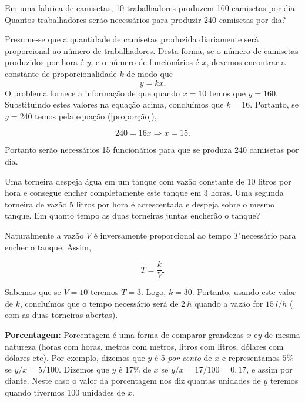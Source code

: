 \begin{exemplo} Em uma fabrica de camisetas, 10 trabalhadores produzem 160 camisetas por dia. Quantos trabalhadores serão necessários para produzir 240 camisetas por dia?

Presume-se que a quantidade de camisetas  produzida diariamente será proporcional ao número de trabalhadores. Desta forma,
se o número de camisetas produzidos por hora é $y$, e o número de funcionários é $x$, devemos encontrar a constante de proporcionalidade $k$ de modo que
\begin{equation}\label{proporção}y=kx.\end{equation}
O problema fornece a informação de que quando $x=10$ temos que $y=160$. Substituindo estes valores na equação acima, concluímos que $k=16$. Portanto, se $y=240$ temos pela equação (\ref{proporção}),

$$240= 16x\Rightarrow x=15.$$

Portanto serão necessários 15 funcionários para que se produza 240 camisetas por dia.
\end{exemplo}

\begin{exemplo} Uma torneira despeja água em um tanque com vazão constante de 10 litros por hora e consegue encher completamente este tanque em 3 horas. Uma segunda torneira de vazão 5 litros por hora é acrescentada e despeja sobre o mesmo tanque. Em quanto tempo as duas torneiras juntas encherão o tanque?

Naturalmente a vazão $V$ é inversamente proporcional ao tempo $T$ necessário para encher o tanque. Assim,

$$T=\frac{k}{V}.$$

Sabemos que se $V=10$ teremos $T=3$. Logo, $k=30$. Portanto, usando este valor de $k$, concluímos que o tempo necessário será de $2\ h$ quando a vazão for  $15\  l/h$ ( com as duas torneiras abertas).

\end{exemplo}

\noindent\textbf{Porcentagem:} Porcentagem é uma forma de comparar grandezas $x$ e$ y$ de mesma natureza (horas com horas, metros com metros, litros com litros, dólares com dólares etc).  Por exemplo, dizemos que $y$ é 5 \textit{por cento} de $x$ e representamos $5\%$  se $y/x=5/100$. Dizemos que $y$ é $17\%$ de $x$  se $y/x=17/100=0,17$, e assim por diante. Neste caso
o valor da porcentagem nos diz quantas unidades de $y$ teremos quando tivermos $100$ unidades de $x$.


